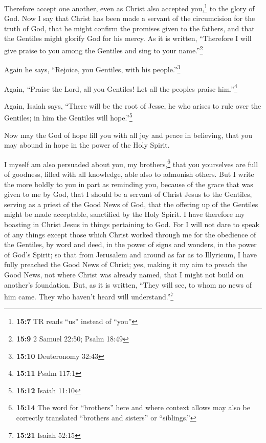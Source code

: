  Therefore accept one another, even as Christ also
accepted you,\footnote{\textbf{15:7} TR reads ``us'' instead of ``you''}
to the glory of God.  Now I say that Christ has been made
a servant of the circumcision for the truth of God, that he might
confirm the promises given to the fathers,  and that the
Gentiles might glorify God for his mercy. As it is written, ``Therefore
I will give praise to you among the Gentiles and sing to your
name.''\footnote{\textbf{15:9} 2 Samuel 22:50; Psalm 18:49}

 Again he says, ``Rejoice, you Gentiles, with his
people.''\footnote{\textbf{15:10} Deuteronomy 32:43}

 Again, ``Praise the Lord, all you Gentiles! Let all the
peoples praise him.''\footnote{\textbf{15:11} Psalm 117:1}

 Again, Isaiah says, ``There will be the root of Jesse,
he who arises to rule over the Gentiles; in him the Gentiles will
hope.''\footnote{\textbf{15:12} Isaiah 11:10}

 Now may the God of hope fill you with all joy and peace
in believing, that you may abound in hope in the power of the Holy
Spirit.

 I myself am also persuaded about you, my
brothers,\footnote{\textbf{15:14} The word for ``brothers'' here and
  where context allows may also be correctly translated ``brothers and
  sisters'' or ``siblings.''} that you yourselves are full of goodness,
filled with all knowledge, able also to admonish others. 
But I write the more boldly to you in part as reminding you, because of
the grace that was given to me by God,  that I should be
a servant of Christ Jesus to the Gentiles, serving as a priest of the
Good News of God, that the offering up of the Gentiles might be made
acceptable, sanctified by the Holy Spirit.  I have
therefore my boasting in Christ Jesus in things pertaining to God.
 For I will not dare to speak of any things except those
which Christ worked through me for the obedience of the Gentiles, by
word and deed,  in the power of signs and wonders, in the
power of God's Spirit; so that from Jerusalem and around as far as to
Illyricum, I have fully preached the Good News of Christ;
 yes, making it my aim to preach the Good News, not where
Christ was already named, that I might not build on another's
foundation.  But, as it is written, ``They will see, to
whom no news of him came. They who haven't heard will
understand.''\footnote{\textbf{15:21} Isaiah 52:15}

